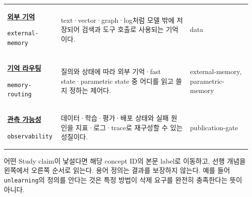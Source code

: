 \begin{longtable}{p{} p{} p{}}
\hypertarget{glossary:external-memory}{\hyperref[bg:external-memory]{\textbf{외부 기억}}} \newline\texttt{external-memory} & text·vector·graph·log처럼 모델 밖에 저장되어 검색과 도구 호출로 사용되는 기억이다. & \scriptsize data \\
\hypertarget{glossary:memory-routing}{\hyperref[bg:memory-routing]{\textbf{기억 라우팅}}} \newline\texttt{memory-routing} & 질의와 상태에 따라 외부 기억·fast state·parametric state 중 어디를 읽고 쓸지 정하는 제어다. & \scriptsize external-memory, parametric-memory \\
\hypertarget{glossary:observability}{\hyperref[bg:observability]{\textbf{관측 가능성}}} \newline\texttt{observability} & 데이터·학습·평가·배포 상태와 실패 원인을 지표·로그·trace로 재구성할 수 있는 성질이다. & \scriptsize publication-gate \\
\end{longtable}
\normalsize

\begin{keypoint}
어떤 Study claim이 낯설다면 해당 concept ID의 본문 label로 이동하고, 선행 개념을
왼쪽에서 오른쪽 순서로 읽는다. 용어 정의는 결과를 보장하지 않는다. 예를 들어
\texttt{unlearning}의 정의를 안다는 것은 특정 방법이 삭제 요구를 완전히 충족한다는 뜻이 아니다.
\end{keypoint}

